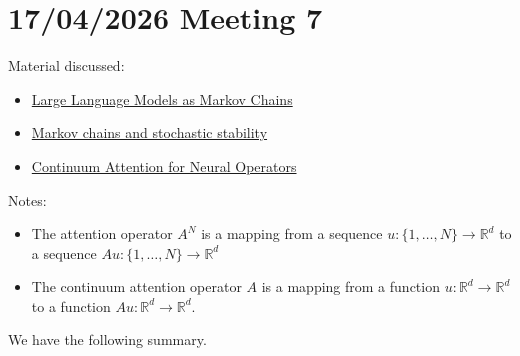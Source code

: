 \documentclass{article}
\begin{document}
\section{17/04/2026 Meeting 7}
Material discussed:
\begin{itemize}
    \item \href{https://arxiv.org/abs/2410.02724}{Large Language Models as Markov Chains}
    \item \href{https://www.cambridge.org/core/books/markov-chains-and-stochastic-stability/E2B82BFB409CD2F7D67AFC5390C565EC}{Markov chains and stochastic stability}
    \item \href{https://arxiv.org/abs/2406.06486}{Continuum Attention for Neural Operators}
\end{itemize}
Notes:
\begin{itemize}
    \item The attention operator $A^N$ is a mapping from a sequence $u: \{1,\ldots, N\} \to \mathbb R^d$ to a sequence $Au:\{1,\ldots, N\} \to \mathbb R^d$
    \item The continuum attention operator $A$ is a mapping from a function $u: \mathbb R^d\to \mathbb R^d$ to a function $Au: \mathbb R^d\to \mathbb R^d$.
\end{itemize}
We have the following summary.
\end{document}

